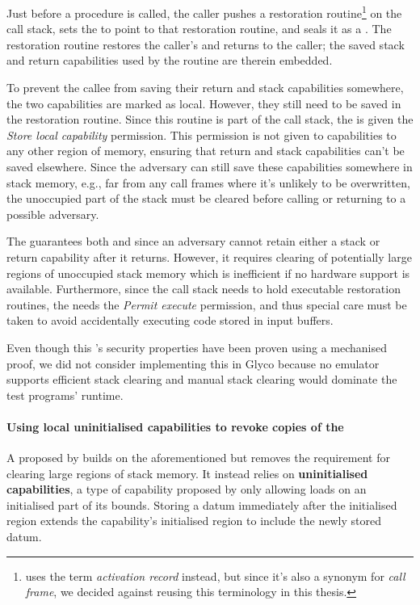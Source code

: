 \documentclass[main.tex]{subfiles}
\begin{document}
Just before a procedure is called, the caller pushes a restoration routine\footnote{\cite{retptr} uses the term \emph{activation record} instead, but since it's also a synonym for \emph{call frame}, we decided against reusing this terminology in this thesis.} on the call stack, sets the  to point to that restoration routine, and seals it as a . The restoration routine restores the caller's  and returns to the caller; the saved stack and return capabilities used by the routine are therein embedded.

To prevent the callee from saving their return and stack capabilities somewhere, the two capabilities are marked as local. However, they still need to be saved in the restoration routine. Since this routine is part of the call stack, the  is given the \emph{Store local capability} permission. This permission is not given to capabilities to any other region of memory, ensuring that return and stack capabilities can't be saved elsewhere. Since the adversary can still save these capabilities somewhere in stack memory, e.g., far from any call frames where it's unlikely to be overwritten, the unoccupied part of the stack must be cleared before calling or returning to a possible adversary.

The  guarantees both  and  since an adversary cannot retain either a stack or return capability after it returns. However, it requires clearing of potentially large regions of unoccupied stack memory which is inefficient if no hardware support is available. Furthermore, since the call stack needs to hold executable restoration routines, the  needs the \emph{Permit execute} permission, and thus special care must be taken to avoid accidentally executing code stored in input buffers.

Even though this 's security properties have been proven using a mechanised proof, we did not consider implementing this  in Glyco because no emulator supports efficient stack clearing and manual stack clearing would dominate the test programs' runtime.

\paragraph{Using local uninitialised capabilities to revoke copies of the } A  proposed by \cite{uninitcapss,uninitcaps} builds on the aforementioned  but removes the requirement for clearing large regions of stack memory. It instead relies on \textbf{uninitialised capabilities}, a type of capability proposed by \cite{uninitcapss} only allowing loads on an initialised part of its bounds. Storing a datum immediately after the initialised region extends the capability's initialised region to include the newly stored datum.
\end{document}
